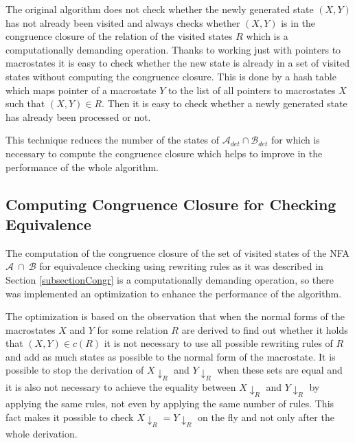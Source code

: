 The original algorithm does not check whether the newly generated state $(X,Y)$ has not already been visited and always checks whether $(X,Y)$ is in
the congruence closure of the relation of the visited states $R$  which is
a computationally demanding operation. Thanks to working just with pointers to macrostates it is easy to check whether the new state is already in a set of 
visited states without computing the congruence closure. This is done by a hash table which maps pointer of a macrostate $Y$ to the list of all
pointers to macrostates $X$ such that $(X,Y)\in R$. Then it is easy to check whether a newly generated state has already been processed or not. 

This technique reduces the number of the states of $\mathcal{A}_{det}\cap\mathcal{B}_{det}$ for which is necessary to compute the congruence closure which helps to
improve in the performance of the whole algorithm.

\subsection{Computing Congruence Closure for Checking Equivalence}
The computation of the congruence closure of the set of visited states of the NFA $\mathcal{A}~\cap~\mathcal{B}$ for equivalence checking using rewriting
rules as it was described in Section \ref{subsectionCongr} is a computationally demanding operation, 
so there was implemented an optimization to enhance the performance of the algorithm.

The optimization is based on the observation that when the normal forms of the macrostates $X$ and $Y$ for some relation $R$ are derived to find out whether
it holds that $(X,Y)\in c(R)$ it is not necessary to use all possible rewriting rules of $R$ and add as much states as possible to the normal form
of the macrostate. It is possible to stop the derivation of
$X{\downarrow_R}$ and $Y{\downarrow_R}$ when these sets are equal and it is also not necessary to achieve the equality between 
$X{\downarrow_R}$ and $Y{\downarrow_R}$ by applying the same rules, not even by applying the same number of rules. 
This fact makes it possible to check $X{\downarrow_R} = Y{\downarrow_R}$ on the fly and not only after the whole derivation.

